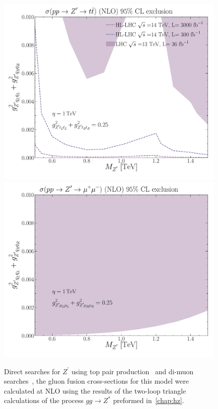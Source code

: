 \begin{figure}[htpb!]
	\includegraphics[scale=0.235]{figures/bounds_xs.pdf}
	\includegraphics[scale=0.235]{figures/zmumu.pdf}
	\caption{Direct searches for $Z^\prime$ using top pair production~\cite{ATLAS:2019npw} and di-muon searches~\cite{ATLAS:2019npw}, the gluon fusion cross-sections for this model were calculated at NLO using the results of the two-loop triangle calculations of the process $ gg \to Z^*$ preformed in~\autoref{chap:hz}.}
	\label{fig:Zp_constraints1}
\end{figure}
